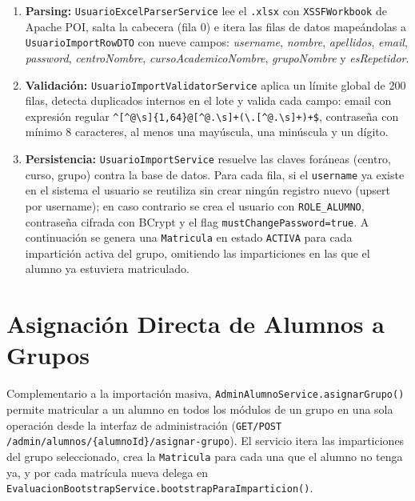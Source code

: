 \documentclass[12pt, a4paper]{report}
\begin{document}
\begin{enumerate}
  \item \textbf{Parsing:} \texttt{UsuarioExcelParserService} lee el \texttt{.xlsx}
        con \texttt{XSSFWorkbook} de Apache POI, salta la cabecera (fila 0) e
        itera las filas de datos mapeándolas a \texttt{UsuarioImportRowDTO} con
        nueve campos: \textit{username}, \textit{nombre}, \textit{apellidos},
        \textit{email}, \textit{password}, \textit{centroNombre},
        \textit{cursoAcademicoNombre}, \textit{grupoNombre} y
        \textit{esRepetidor}.
  \item \textbf{Validación:} \texttt{UsuarioImportValidatorService} aplica un
        límite global de 200 filas, detecta duplicados internos en el lote y
        valida cada campo: email con expresión regular
        \texttt{\^{}[\^{}@\textbackslash{}s]\{1,64\}@[\^{}@.\textbackslash{}s]+(\textbackslash{}.[\^{}@.\textbackslash{}s]+)+\$},
        contraseña con mínimo 8 caracteres, al menos una mayúscula, una minúscula
        y un dígito.
  \item \textbf{Persistencia:} \texttt{UsuarioImportService} resuelve las claves
        foráneas (centro, curso, grupo) contra la base de datos. Para cada fila,
        si el \texttt{username} ya existe en el sistema el usuario se reutiliza
        sin crear ningún registro nuevo (upsert por username); en caso contrario
        se crea el usuario con \texttt{ROLE\_ALUMNO}, contraseña cifrada con
        BCrypt y el flag \texttt{mustChangePassword=true}. A continuación se
        genera una \texttt{Matricula} en estado \texttt{ACTIVA} para cada
        impartición activa del grupo, omitiendo las imparticiones en las que el
        alumno ya estuviera matriculado.
\end{enumerate}

\section{Asignación Directa de Alumnos a Grupos}

Complementario a la importación masiva, \texttt{AdminAlumnoService.asignarGrupo()}
permite matricular a un alumno en todos los módulos de un grupo en una sola operación
desde la interfaz de administración (\texttt{GET/POST /admin/alumnos/\{alumnoId\}/asignar-grupo}).
El servicio itera las imparticiones del grupo seleccionado, crea la \texttt{Matricula}
para cada una que el alumno no tenga ya, y por cada matrícula nueva delega en
\texttt{EvaluacionBootstrapService.bootstrapParaImparticion()}.
\end{document}
